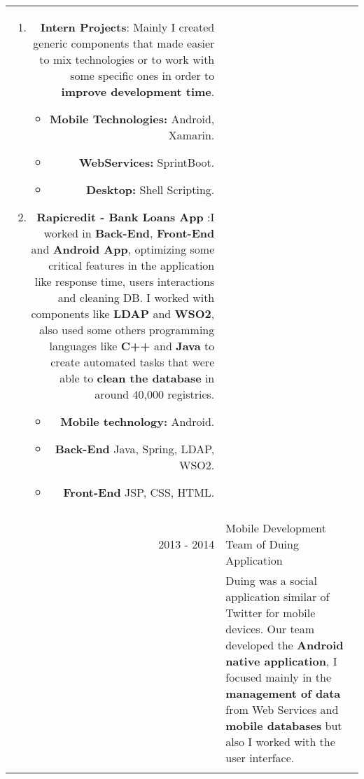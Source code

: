\documentclass[a4paper,10pt]{article} %
\begin{document}
\begin{tabular}{r|p{11cm}}
{\begin{enumerate}
\begin{itemize}
\end{itemize}
\item \textbf{Intern Projects}: Mainly I created generic components that made easier to mix technologies or to work with some specific ones in order to \textbf{improve development time}. \linebreak
\begin{itemize}
\item \textbf{Mobile Technologies:} Android, Xamarin.
\item \textbf{WebServices:} SprintBoot.
\item \textbf{Desktop:} Shell Scripting.
\end{itemize}
\item \textbf{Rapicredit  - Bank Loans App} :I worked in \textbf{Back-End}, \textbf{Front-End} and \textbf{Android App}, optimizing some critical features in the application like response time, users interactions and cleaning DB. I worked with components like \textbf{LDAP} and \textbf{WSO2}, also used some others programming languages like \textbf{C++} and \textbf{Java} to create automated tasks that were able to \textbf{clean the database} in around 40,000 registries. \linebreak
\begin{itemize}
\item \textbf{Mobile technology:} Android.
\item \textbf{Back-End} Java, Spring, LDAP, WSO2.
\item \textbf{Front-End} JSP, CSS, HTML.
\end{itemize}
\end{enumerate}} \\
\multicolumn{2}{c}{} \\
\textsc{2013 - 2014} & Mobile Development Team of Duing Application\\
& \footnotesize{Duing was a social application similar of Twitter for mobile devices. Our team developed the \textbf{Android native application}, I focused mainly in the \textbf{management of data} from Web Services and \textbf{mobile databases} but also I worked with the user interface.}\\
\multicolumn{2}{c}{} \\
\end{tabular}



\end{document}
